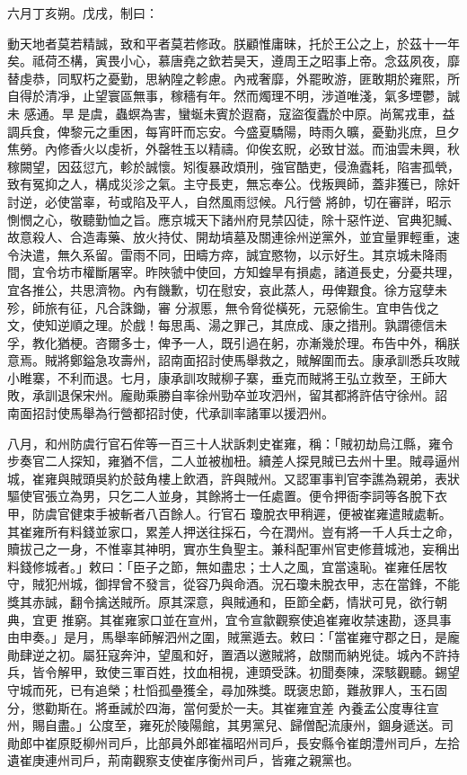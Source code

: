 \begin{pinyinscope}
 六月丁亥朔。戊戌，制曰：



 動天地者莫若精誠，致和平者莫若修政。朕顧惟庸昧，托於王公之上，於茲十一年矣。祗荷丕構，寅畏小心，慕唐堯之欽若昊天，遵周王之昭事上帝。念茲夙夜，靡替虔恭，同馭朽之憂勤，思納隍之軫慮。內戒奢靡，外罷畋游，匪敢期於雍熙，所自得於清凈，止望寰區無事，稼穡有年。然而燭理不明，涉道唯淺，氣多堙鬱，誠未
 感通。旱是虞，蟲螟為害，蠻蜒未賓於遐裔，寇盜復蠹於中原。尚駕戎車，益調兵食，俾黎元之重困，每宵旰而忘安。今盛夏驕陽，時雨久曠，憂勤兆庶，旦夕焦勞。內修香火以虔祈，外罄牲玉以精禱。仰俟玄貺，必致甘滋。而油雲未興，秋稼闕望，因茲愆亢，軫於誠懷。矧復暴政煩刑，強官酷吏，侵漁蠹耗，陷害孤煢，致有冤抑之人，構成災沴之氣。主守長吏，無忘奉公。伐叛興師，蓋非獲已，除奸討逆，必使當辜，茍或陷及平人，自然風雨愆候。凡行營
 將帥，切在審詳，昭示惻憫之心，敬聽勤恤之旨。應京城天下諸州府見禁囚徒，除十惡忤逆、官典犯贓、故意殺人、合造毒藥、放火持仗、開劫墳墓及關連徐州逆黨外，並宜量罪輕重，速令決遣，無久系留。雷雨不同，田疇方瘁，誠宜愍物，以示好生。其京城未降雨間，宜令坊市權斷屠宰。昨陜虢中使回，方知蝗旱有損處，諸道長史，分憂共理，宜各推公，共思濟物。內有饑歉，切在慰安，哀此蒸人，毋俾艱食。徐方寇孽未殄，師旅有征，凡合誅鋤，審
 分淑慝，無令脅從橫死，元惡偷生。宜申告伐之文，使知逆順之理。於戲！每思禹、湯之罪己，其庶成、康之措刑。孰謂德信未孚，教化猶梗。咨爾多士，俾予一人，既引過在躬，亦漸幾於理。布告中外，稱朕意焉。賊將鄭鎰急攻壽州，詔南面招討使馬舉救之，賊解圍而去。康承訓悉兵攻賊小睢寨，不利而退。七月，康承訓攻賊柳子寨，垂克而賊將王弘立救至，王師大敗，承訓退保宋州。龐勛乘勝自率徐州勁卒並攻泗州，留其都將許佶守徐州。詔
 南面招討使馬舉為行營都招討使，代承訓率諸軍以援泗州。



 八月，和州防虞行官石侔等一百三十人狀訴刺史崔雍，稱：「賊初劫烏江縣，雍令步奏官二人探知，雍猶不信，二人並被枷杻。續差人探見賊已去州十里。賊尋逼州城，崔雍與賊頭吳約於鼓角樓上飲酒，許與賊州。又認軍事判官李譙為親弟，表狀驅使官張立為男，只乞二人並身，其餘將士一任處置。便令押衙李詞等各脫下衣甲，防虞官健束手被斬者八百餘人。行官石
 瓊脫衣甲稍遲，便被崔雍遣賊處斬。其崔雍所有料錢並家口，累差人押送往採石，今在潤州。豈有將一千人兵士之命，贖拔己之一身，不惟辜其神明，實亦生負聖主。兼科配軍州官吏修葺城池，妄稱出料錢修城者。」敕曰：「臣子之節，無如盡忠；士人之風，宜當遠恥。崔雍任居牧守，賊犯州城，御捍曾不發言，從容乃與命酒。況石瓊未脫衣甲，志在當鋒，不能獎其赤誠，翻令擒送賊所。原其深意，與賊通和，臣節全虧，情狀可見，欲行朝典，宜更
 推窮。其崔雍家口並在宣州，宜令宣歙觀察使追崔雍收禁速勘，逐具事由申奏。」是月，馬舉率師解泗州之圍，賊黨遁去。敕曰：「當崔雍守郡之日，是龐勛肆逆之初。屬狂寇奔沖，望風和好，置酒以邀賊將，啟關而納兇徒。城內不許持兵，皆令解甲，致使三軍百姓，抆血相視，連頭受誅。初聞奏陳，深駭觀聽。錫望守城而死，已有追榮；杜慆孤壘獲全，尋加殊獎。既褒忠節，難赦罪人，玉石固分，懲勸斯在。將垂誡於四海，當何愛於一夫。其崔雍宜差
 內養孟公度專往宣州，賜自盡。」公度至，雍死於陵陽館，其男黨兒、歸僧配流康州，錮身遞送。司勛郎中崔原貶柳州司戶，比部員外郎崔福昭州司戶，長安縣令崔朗澧州司戶，左拾遺崔庚連州司戶，荊南觀察支使崔序衡州司戶，皆雍之親黨也。




\end{pinyinscope}
